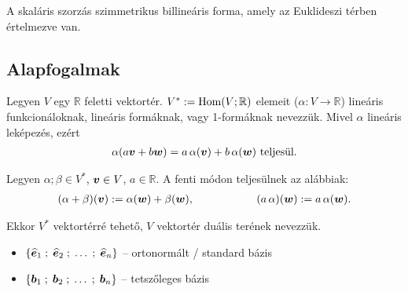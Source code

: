 \documentclass[main.tex]{subfiles}
\begin{document}

A skaláris szorzás szimmetrikus billineáris forma,
amely az Euklideszi térben értelmezve van.


\subsection{Alapfogalmak}



Legyen $V$ egy $\mathbb{R}$ feletti vektortér.
$V^{*} := \mathrm{Hom}(V; \mathbb{R})$ elemeit
($\alpha: V \rightarrow \mathbb{R}$)
lineáris funkcionáloknak, lineáris
formáknak, vagy 1-formáknak nevezzük.
Mivel $\alpha$ lineáris leképezés, ezért
\begin{gather*}
  \alpha(a \bm{v} + b \bm{w})
  = a \, \alpha(\bm{v}) + b \, \alpha(\bm{w})
  \text{ teljesül.}
\end{gather*}




Legyen $\alpha; \beta \in V^{*}$, $\bm{v} \in V$,
$a \in \mathbb{R}$. A fenti módon teljesülnek az alábbiak:
\begin{gather*}
  (\alpha + \beta)(\rvec{v}) := \alpha(\rvec{w}) + \beta(\rvec{w}),
  \hspace{20mm}
  (a \, \alpha)(\rvec{w}) := a \, \alpha(\rvec{w}).
\end{gather*}

Ekkor $V^{*}$ vektortérré tehető,
$V$ vektortér duális terének nevezzük.



\begin{itemize}
  \item ${\left\{
              \widehat{\bm{e}}_1 \; ; \;
              \widehat{\bm{e}}_2 \; ; \;
              \dots \; ; \;
              \widehat{\bm{e}}_n
              \right\}}$
        \tabto{4cm} –  \tabto{4.6cm}
        ortonormált / standard bázis

  \item ${\left\{
              \bm{b}_1 \; ; \;
              \bm{b}_2 \; ; \;
              \dots \; ; \;
              \bm{b}_n
              \right\}}$
        \tabto{4cm} –  \tabto{4.6cm}
        tetszőleges bázis
\end{itemize}
\end{document}
